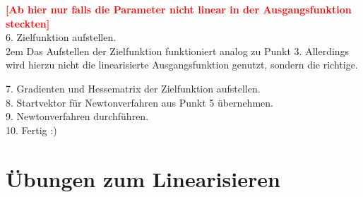 \documentclass[11pt,final]{scrreprt}
\newcommand{\br} {\medskip\\}
\begin{document}
\textcolor{red}{\textbf{[Ab hier nur falls die Parameter nicht linear in der Ausgangsfunktion steckten]}}\br

6. Zielfunktion aufstellen.\\

\begingroup
\leftskip2em 
Das Aufstellen der Zielfunktion funktioniert analog zu Punkt 3. Allerdings wird hierzu nicht die linearisierte Ausgangsfunktion genutzt, sondern die richtige.\\
\par	
\endgroup

7. Gradienten und Hessematrix der Zielfunktion aufstellen.\\

8. Startvektor für Newtonverfahren aus Punkt 5 übernehmen.\\

9. Newtonverfahren durchführen.\\

10. Fertig :)\\

\section{Übungen zum Linearisieren}
\end{document}
